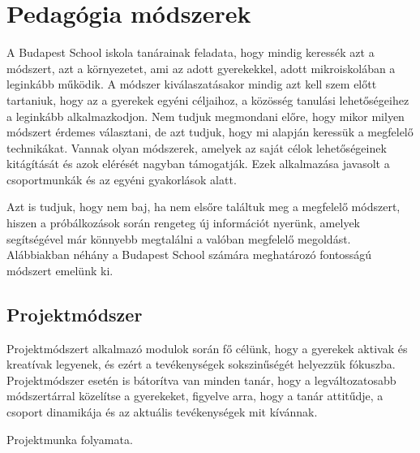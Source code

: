 \section{Pedagógia
  módszerek}
\label{sec:pedagogia_modszerek}

A Budapest School iskola tanárainak feladata, hogy mindig keressék azt a
módszert, azt a környezetet, ami az adott gyerekekkel, adott mikroiskolában a
leginkább működik. A módszer kiválaszatásakor mindig azt kell szem előtt
tartaniuk, hogy az a gyerekek egyéni céljaihoz, a közösség tanulási
lehetőségeihez a leginkább alkalmazkodjon. Nem tudjuk megmondani előre, hogy mikor milyen módszert érdemes választani, de
azt tudjuk, hogy mi alapján keressük a megfelelő technikákat. Vannak olyan módszerek, amelyek az
saját célok lehetőségeinek kitágítását és azok elérését nagyban támogatják.
Ezek alkalmazása javasolt a csoportmunkák és az egyéni gyakorlások alatt.

Azt is tudjuk,
hogy nem baj, ha nem elsőre találtuk meg a megfelelő módszert, hiszen a
próbálkozások során rengeteg új információt nyerünk, amelyek segítségével már
könnyebb megtalálni a valóban megfelelő megoldást. Alábbiakban néhány a Budapest School számára meghatározó fontosságú módszert
emelünk ki.

\subsection{Projektmódszer}
Projektmódszert alkalmazó modulok során fő célünk, hogy a gyerekek aktivak és
kreatívak legyenek, és ezért a tevékenységek sokszinűségét helyezzük fókuszba.
Projektmódszer esetén is bátorítva van minden tanár, hogy a legváltozatosabb
módszertárral közelítse a gyerekeket, figyelve arra, hogy a tanár attitűdje, a
csoport dinamikája és az aktuális tevékenységek mit kívánnak.

Projektmunka folyamata.

